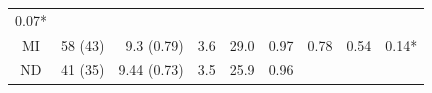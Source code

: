 \documentclass[fleqn,10pt,lineno]{wlpeerj} %
\theoremstyle{definition}
\theoremstyle{definition}
\theoremstyle{definition}
\theoremstyle{remark}
\begin{document}
\begin{longtable}[]{@{}crrrrllrl@{}}
\begin{minipage}[t]{0.07\columnwidth}
0.07*\strut
\end{minipage}\tabularnewline
\begin{minipage}[t]{0.12\columnwidth}\centering\strut
MI\strut
\end{minipage} & \begin{minipage}[t]{0.08\columnwidth}\raggedleft\strut
58 (43)\strut
\end{minipage} & \begin{minipage}[t]{0.13\columnwidth}\raggedleft\strut
9.3 (0.79)\strut
\end{minipage} & \begin{minipage}[t]{0.04\columnwidth}\raggedleft\strut
3.6\strut
\end{minipage} & \begin{minipage}[t]{0.05\columnwidth}\raggedleft\strut
29.0\strut
\end{minipage} & \begin{minipage}[t]{0.11\columnwidth}\raggedright\strut
0.97\strut
\end{minipage} & \begin{minipage}[t]{0.06\columnwidth}\raggedright\strut
0.78\strut
\end{minipage} & \begin{minipage}[t]{0.06\columnwidth}\raggedleft\strut
0.54\strut
\end{minipage} & \begin{minipage}[t]{0.07\columnwidth}\raggedright\strut
0.14*\strut
\end{minipage}\tabularnewline
\begin{minipage}[t]{0.12\columnwidth}\centering\strut
ND\strut
\end{minipage} & \begin{minipage}[t]{0.08\columnwidth}\raggedleft\strut
41 (35)\strut
\end{minipage} & \begin{minipage}[t]{0.13\columnwidth}\raggedleft\strut
9.44 (0.73)\strut
\end{minipage} & \begin{minipage}[t]{0.04\columnwidth}\raggedleft\strut
3.5\strut
\end{minipage} & \begin{minipage}[t]{0.05\columnwidth}\raggedleft\strut
25.9\strut
\end{minipage} & \begin{minipage}[t]{0.11\columnwidth}\raggedright\strut
0.96\strut
\end{minipage} & \begin{minipage}[t]{0.06\columnwidth}\raggedright\strut

\end{minipage}
\end{longtable}
\end{document}
